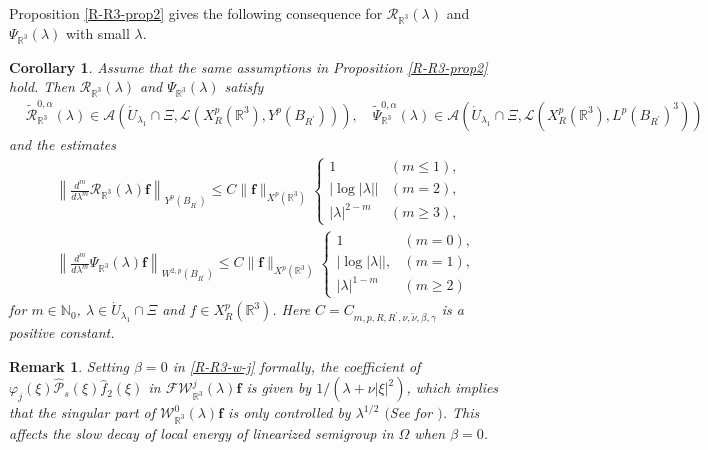 \documentclass[dvipdfmx,12pt]{article}
\newtheorem{rem}[dfn]{Remark}
\newtheorem{cor}[dfn]{Corollary}
\begin{document}
\vskip 1mm
Proposition \ref{R-R3-prop2} gives the following consequence for $\mathcal{R}_{\mathbb{R}^3}(\lambda)$ and $\Psi_{\mathbb{R}^3}(\lambda)$  with small $\lambda$.
\begin{cor}\label{R-R3-Cor1} 
Assume that the same assumptions in Proposition \ref{R-R3-prop2} hold. Then $\mathcal{R}_{\mathbb{R}^3}(\lambda)$ and $\Psi_{\mathbb{R}^3}(\lambda)$ satisfy
\begin{align*}
&\widetilde{\mathcal{R}}_{\mathbb{R}^3}^{0,\alpha}(\lambda)\in \mathcal{A}(\dot{U}_{\lambda_1}\cap \Xi, \mathcal{L}(X_R^{p}(\mathbb{R}^3),Y^p(B_{R^\prime})) ),
\quad
\widetilde{\Psi}_{\mathbb{R}^3}^{0,\alpha}(\lambda)\in \mathcal{A}(\dot{U}_{\lambda_1}\cap \Xi, \mathcal{L}(X_R^{p}(\mathbb{R}^3),L^{p}(B_{R^\prime})^3 ) )
\end{align*}
and the estimates
\begin{align}
&\left\| \frac{d^m}{d\lambda^m}\mathcal{R}_{\mathbb{R}^3}(\lambda)\mathbf{f}\right\|_{Y^p(B_{R^\prime})} 
\le C\|\mathbf{f}\|_{X^p(\mathbb{R}^3)}
\begin{cases}
1 & (m\le1), \\
\left|\log |\lambda|\right| & (m=2), \\
|\lambda|^{2-m} &(m\ge3),
\end{cases}
\label{R-R3-Cor1-1}\\
&\left\| \frac{d^m}{d\lambda^m}\Psi_{\mathbb{R}^3}(\lambda)\mathbf{f}\right\|_{W^{2,p}(B_{R^\prime})} 
\le C\|\mathbf{f}\|_{X^p(\mathbb{R}^3)}
\begin{cases}
1 & (m=0), \\
\left|\log |\lambda|\right|, & (m=1), \\
|\lambda|^{1-m} &(m\ge2)
\end{cases}
\label{R-R3-Cor1-2}
\end{align}
for $m\in\mathbb{N}_0$, $\lambda\in \Dot{U}_{\lambda_1}\cap \Xi$ and $f\in X_R^p(\mathbb{R}^3)$. Here $C=C_{m,p,R,R^\prime,\nu,\tilde{\nu},\beta,\gamma}$  is a positive constant. 
\end{cor}

\begin{rem}
Setting $\beta=0$ in \eqref{R-R3-w-j} formally, the coefficient of $\varphi_j(\xi)\widehat{\mathcal{P}}_s(\xi)\widehat{f}_2(\xi)$ in $\mathcal{F}\mathcal{W}_{\mathbb{R}^3}^j(\lambda)\mathbf{f}$ is given by $1/(\lambda+\nu|\xi|^2)$, which implies that the singular part of $\mathcal{W}_{\mathbb{R}^3}^0(\lambda)\mathbf{f}$ is only controlled by $\lambda^{1/2}$ $($See for {\rm \cite{K97,SE18}}$)$. This affects the slow decay of local energy of linearized semigroup in $\Omega$ when $\beta=0$.    
\end{rem}
\end{document}
